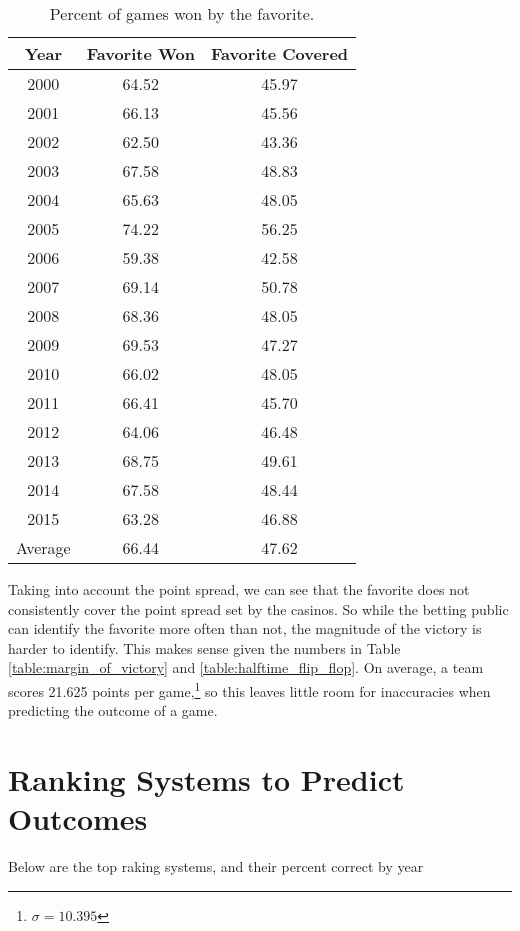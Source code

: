 \documentclass[11pt]{article}
\newcommand{\stddev}{\sigma}
\begin{document}
\begin{table}[!htb]
\begin{center}
\scriptsize
\begin{tabular}{|c|c|c|}
\hline
Year & Favorite Won & Favorite Covered\\
\hline
2000 & 64.52 & 45.97\\
2001 & 66.13 & 45.56\\
2002 & 62.50 & 43.36\\
2003 & 67.58 & 48.83\\
2004 & 65.63 & 48.05\\
2005 & 74.22 & 56.25\\
2006 & 59.38 & 42.58\\
2007 & 69.14 & 50.78\\
2008 & 68.36 & 48.05\\
2009 & 69.53 & 47.27\\
2010 & 66.02 & 48.05\\
2011 & 66.41 & 45.70\\
2012 & 64.06 & 46.48\\
2013 & 68.75 & 49.61\\
2014 & 67.58 & 48.44\\
2015 & 63.28 & 46.88\\
\hline
Average & 66.44 & 47.62\\
\hline
\end{tabular}
\caption{Percent of games won by the favorite.}\label{table:favorite_wins}
\end{center}
\end{table}

Taking into account the point spread, we can see that the favorite does not consistently cover the point spread set by the casinos. So while the betting public can identify the favorite more often than not, the magnitude of the victory is harder to identify. This makes sense given the numbers in Table \ref{table:margin_of_victory} and \ref{table:halftime_flip_flop}. On average, a team scores 21.625 points per game,\footnote{$\stddev = 10.395$} so this leaves little room for inaccuracies when predicting the outcome of a game. 

\section{Ranking Systems to Predict Outcomes}

Below are the top raking systems, and their percent correct by year

%
% 
\end{document}
